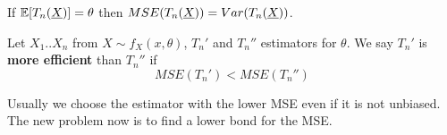 \begin{oss}
	If $\mathbb{E}[T_n(\underline X)]=\theta$ then $MSE(T_n(\underline X))=Var(T_n(\underline X))$.
\end{oss}
\begin{defi}
	Let $X_1.. X_n$ from $X\sim f_X(x,\theta)$, $T_n'$ and $T_n''$ estimators for $\theta$. We say $T_n'$ is  \textbf{more efficient} than $T_n''$ if
	$$MSE(T_n')<MSE(T_n'')$$
\end{defi}
Usually we choose the estimator with the lower MSE even if it is not unbiased.\\
The new problem now is to find a lower bond for the MSE.